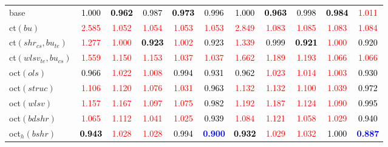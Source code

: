 \begin{tabular}[t]{l|>{}cccc>{}c|ccccc}
base & \textcolor{black}{1.000} & \textcolor{black}{\textbf{0.962}} & \textcolor{black}{0.987} & \textcolor{black}{\textbf{0.973}} & \textcolor{black}{0.996} & \textcolor{black}{1.000} & \textcolor{black}{\textbf{0.963}} & \textcolor{black}{0.998} & \textcolor{black}{\textbf{0.984}} & \textcolor{red}{1.011}\\
ct$(bu)$ & \textcolor{red}{2.585} & \textcolor{red}{1.052} & \textcolor{red}{1.054} & \textcolor{red}{1.053} & \textcolor{red}{1.053} & \textcolor{red}{2.849} & \textcolor{red}{1.083} & \textcolor{red}{1.085} & \textcolor{red}{1.083} & \textcolor{red}{1.084}\\
ct$(shr_{cs}, bu_{te})$ & \textcolor{red}{1.277} & \textcolor{red}{1.000} & \textcolor{black}{\textbf{0.923}} & \textcolor{red}{1.002} & \textcolor{black}{0.923} & \textcolor{red}{1.339} & \textcolor{black}{0.999} & \textcolor{black}{\textbf{0.921}} & \textcolor{red}{1.000} & \textcolor{black}{0.920}\\
ct$(wlsv_{te}, bu_{cs})$ & \textcolor{red}{1.559} & \textcolor{red}{1.150} & \textcolor{red}{1.153} & \textcolor{red}{1.037} & \textcolor{red}{1.037} & \textcolor{red}{1.662} & \textcolor{red}{1.189} & \textcolor{red}{1.193} & \textcolor{red}{1.066} & \textcolor{red}{1.066}\\
oct$(ols)$ & \textcolor{black}{0.966} & \textcolor{red}{1.022} & \textcolor{red}{1.008} & \textcolor{black}{0.994} & \textcolor{black}{0.931} & \textcolor{black}{0.962} & \textcolor{red}{1.023} & \textcolor{red}{1.014} & \textcolor{red}{1.003} & \textcolor{black}{0.930}\\
oct$(struc)$ & \textcolor{red}{1.106} & \textcolor{red}{1.120} & \textcolor{red}{1.076} & \textcolor{red}{1.031} & \textcolor{black}{0.963} & \textcolor{red}{1.132} & \textcolor{red}{1.132} & \textcolor{red}{1.100} & \textcolor{red}{1.039} & \textcolor{black}{0.972}\\
oct$(wlsv)$ & \textcolor{red}{1.157} & \textcolor{red}{1.167} & \textcolor{red}{1.097} & \textcolor{red}{1.075} & \textcolor{black}{0.982} & \textcolor{red}{1.192} & \textcolor{red}{1.187} & \textcolor{red}{1.124} & \textcolor{red}{1.090} & \textcolor{black}{0.995}\\
oct$(bdshr)$ & \textcolor{red}{1.065} & \textcolor{red}{1.112} & \textcolor{red}{1.041} & \textcolor{red}{1.025} & \textcolor{black}{0.939} & \textcolor{red}{1.084} & \textcolor{red}{1.121} & \textcolor{red}{1.058} & \textcolor{red}{1.029} & \textcolor{black}{0.940}\\
oct$_h(bshr)$ & \textcolor{black}{\textbf{0.943}} & \textcolor{red}{1.028} & \textcolor{red}{1.028} & \textcolor{black}{0.994} & \textcolor{blue}{\textbf{0.900}} & \textcolor{black}{\textbf{0.932}} & \textcolor{red}{1.029} & \textcolor{red}{1.032} & \textcolor{black}{1.000} & \textcolor{blue}{\textbf{0.887}}\\

\end{tabular}
